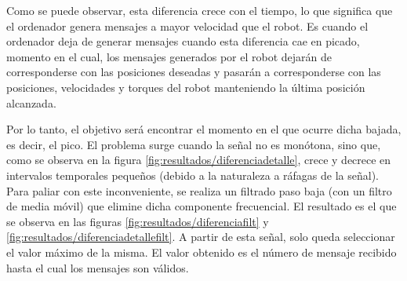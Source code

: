 Como se puede observar, esta diferencia crece con el tiempo, lo que significa que el ordenador genera mensajes a mayor velocidad que el robot. Es cuando el ordenador deja de generar mensajes cuando esta diferencia cae en picado, momento en el cual, los mensajes generados por el robot dejarán de corresponderse con las posiciones deseadas y pasarán a corresponderse con las posiciones, velocidades y torques del robot manteniendo la última posición alcanzada.

Por lo tanto, el objetivo será encontrar el momento en el que ocurre dicha bajada, es decir, el pico. El problema surge cuando la señal no es monótona, sino que, como se observa en la figura \ref{fig:resultados/diferenciadetalle}, crece y decrece en intervalos temporales pequeños (debido a la naturaleza a ráfagas de la señal). Para paliar con este inconveniente, se realiza un filtrado paso baja (con un filtro de media móvil) que elimine dicha componente frecuencial. El resultado es el que se observa en las figuras \ref{fig:resultados/diferenciafilt} y \ref{fig:resultados/diferenciadetallefilt}. A partir de esta señal, solo queda seleccionar el valor máximo de la misma. El valor obtenido es el número de mensaje recibido hasta el cual los mensajes son válidos.

